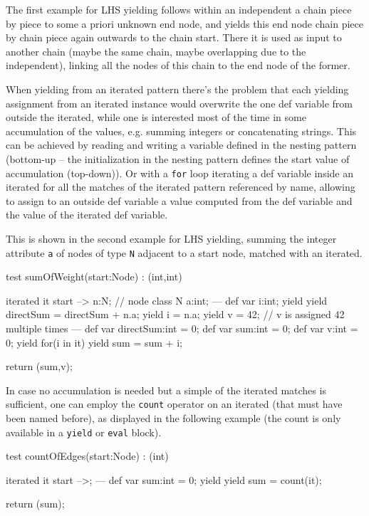 The first example for LHS yielding follows within an independent a chain piece by piece to some a priori unknown end node, and yields this end node chain piece by chain piece again outwards to the chain start. There it is used as input to another chain (maybe the same chain, maybe overlapping due to the independent), linking all the nodes of this chain to the end node of the former.

When yielding from an iterated pattern there's the problem that each yielding assignment from an iterated instance would overwrite the one def variable from outside the iterated, while one is interested most of the time in some accumulation of the values, e.g. summing integers or concatenating strings.
This can be achieved by reading and writing a variable defined in the nesting pattern (bottom-up -- the initialization in the nesting pattern defines the start value of accumulation (top-down)).
Or with a \texttt{for} loop iterating a def variable inside an iterated for all the matches of the iterated pattern referenced by name, allowing to assign to an outside def variable a value computed from the def variable and the value of the iterated def variable.

This is shown in the second example for LHS yielding, summing the integer attribute \texttt{a} of nodes of type \texttt{N} adjacent to a start node, matched with an iterated.

\begin{example}
  \begin{grgen}
test sumOfWeight(start:Node) : (int,int)
{
  iterated it {
    start --> n:N; // node class N { a:int; }
  ---
    def var i:int;
    yield {
      yield directSum = directSum + n.a;
      yield i = n.a;
      yield v = 42; // v is assigned 42 multiple times
    }
  } 
---
  def var directSum:int = 0;
  def var sum:int = 0;
  def var v:int = 0;
  yield {
    for(i in it)
    {
      yield sum = sum + i;
    }
  }

  return (sum,v);
}
  \end{grgen}
\end{example}

In case no accumulation is needed but a simple  of the iterated matches is sufficient, one can employ the \texttt{count} operator on an iterated (that must have been named before), as displayed in the following example (the count is only available in a \texttt{yield} or \texttt{eval} block).

\begin{example}
  \begin{grgen}
test countOfEdges(start:Node) : (int)
{
	iterated it {
		start -->;
	} 
---
	def var sum:int = 0;
	yield {
		yield sum = count(it);
	}

	return (sum);
}
  \end{grgen}
\end{example}

